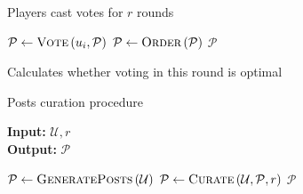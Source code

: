     \begin{algorithm}[H]
      \caption{Players cast votes for $r$ rounds}
      \label{alg:curation}
      \begin{algorithmic}[1]
              \State $\mathcal{P} \leftarrow \textsc{Vote}\left(u_i,
              \mathcal{P}\right)$
            \EndIf
          \EndFor
          \State $\mathcal{P} \leftarrow \textsc{Order}\left(\mathcal{P}\right)$
        \EndFor
        \State \Return $\mathcal{P}$
      \EndFunction
      \end{algorithmic}
    \end{algorithm}

    \begin{algorithm}[H]
      \caption{Calculates whether voting in this round is optimal}
      \label{alg:isvoteround}
      \begin{algorithmic}[1]
          \State 
        \EndFunction
      \end{algorithmic}
    \end{algorithm}

    \begin{algorithm}[H]
      \caption{Posts curation procedure}
      \label{alg:main}
      \hspace*{\algorithmicindent} \textbf{Input:} $\mathcal{U}, r$ \\
      \hspace*{\algorithmicindent} \textbf{Output:} $\mathcal{P}$
      \begin{algorithmic}[1]
      \State $\mathcal{P} \leftarrow
      \textsc{GeneratePosts}\left(\mathcal{U}\right)$
      \State $\mathcal{P} \leftarrow \textsc{Curate}\left(\mathcal{U},
      \mathcal{P}, r\right)$
      \State \Return $\mathcal{P}$
      \end{algorithmic}
    \end{algorithm}
